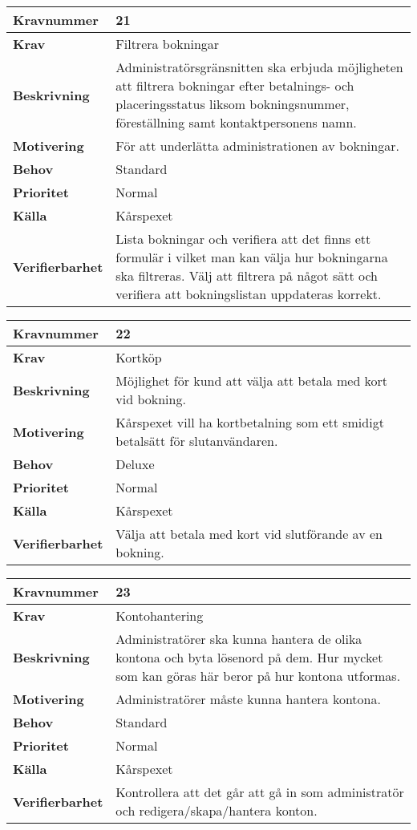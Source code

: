 \documentclass[a4paper, twoside, 11pt, titlepage]{article}
\begin{document}
\begin{tabular} { | p{3cm} | p{12.2cm} | }
	\hline
	\textbf{Kravnummer} & 21  \\
	\hline
	\textbf{Krav} & Filtrera bokningar  \\
	\hline
	\textbf{Beskrivning} & Administratörsgränsnitten ska erbjuda möjligheten att filtrera bokningar efter betalnings- och placeringsstatus liksom bokningsnummer, föreställning samt kontaktpersonens namn.  \\
	\hline
	\textbf{Motivering} & För att underlätta administrationen av bokningar.  \\
	\hline
	\textbf{Behov} & Standard  \\
	\hline
	\textbf{Prioritet} & Normal  \\
	\hline
	\textbf{Källa} & Kårspexet  \\
	\hline
	\textbf{Verifierbarhet} & Lista bokningar och verifiera att det finns ett formulär i vilket man kan välja hur bokningarna ska filtreras. Välj att filtrera på något sätt och verifiera att bokningslistan uppdateras korrekt.  \\
	\hline
\end{tabular}

\begin{tabular} { | p{3cm} | p{12.2cm} | }
	\hline
	\textbf{Kravnummer} & 22  \\
	\hline
	\textbf{Krav} & Kortköp  \\
	\hline
	\textbf{Beskrivning} & Möjlighet för kund att välja att betala med kort vid bokning.  \\
	\hline
	\textbf{Motivering} & Kårspexet vill ha kortbetalning som ett smidigt betalsätt för slutanvändaren.  \\
	\hline
	\textbf{Behov} & Deluxe  \\
	\hline
	\textbf{Prioritet} & Normal  \\
	\hline
	\textbf{Källa} & Kårspexet  \\
	\hline
	\textbf{Verifierbarhet} & Välja att betala med kort vid slutförande av en bokning.  \\
	\hline
\end{tabular}

\begin{tabular} { | p{3cm} | p{12.2cm} | }
	\hline
	\textbf{Kravnummer} & 23  \\
	\hline
	\textbf{Krav} & Kontohantering  \\
	\hline
	\textbf{Beskrivning} & Administratörer ska kunna hantera de olika kontona och byta lösenord på dem. Hur mycket som kan göras här beror på hur kontona utformas.  \\
	\hline
	\textbf{Motivering} & Administratörer måste kunna hantera kontona.  \\
	\hline
	\textbf{Behov} & Standard  \\
	\hline
	\textbf{Prioritet} & Normal  \\
	\hline
	\textbf{Källa} & Kårspexet  \\
	\hline
	\textbf{Verifierbarhet} & Kontrollera att det går att gå in som administratör och redigera/skapa/hantera konton.  \\
	\hline
\end{tabular}
\end{document}
